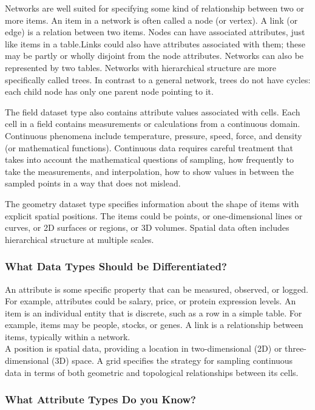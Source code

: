 \documentclass[
]{book}
\begin{document}
Networks are well suited for specifying some kind of relationship between two or more items. An item in a network is often called a node (or vertex). A link (or edge) is a relation between two items. Nodes can have associated attributes, just like items in a table.Links could also have attributes associated with them; these may be partly or wholly disjoint from the node attributes. Networks can also be represented by two tables. Networks with hierarchical structure are more specifically called trees. In contrast to a general network, trees do not have cycles: each child node has only one parent node pointing to it.

The field dataset type also contains attribute values associated with cells. Each cell in a field contains measurements or calculations from a continuous domain. Continuous phenomena include temperature, pressure, speed, force, and density (or mathematical functions).
Continuous data requires careful treatment that takes into account the mathematical questions of sampling, how frequently to take the measurements, and interpolation, how to show values in between the sampled points in a way that does not mislead.

The geometry dataset type specifies information about the shape of items with explicit spatial positions. The items could be points, or one-dimensional lines or curves, or 2D surfaces or regions, or 3D volumes. Spatial data often includes hierarchical structure at multiple scales.

\hypertarget{what-data-types-should-be-differentiated}{%
\subsubsection{What Data Types Should be Differentiated?}\label{what-data-types-should-be-differentiated}}

An attribute is some specific property that can be measured, observed, or logged. For example, attributes could be salary, price, or protein expression levels.
An item is an individual entity that is discrete, such as a row in a simple table. For example, items may be people, stocks, or genes.
A link is a relationship between items, typically within a network.\\
A position is spatial data, providing a location in two-dimensional (2D) or three-dimensional (3D) space.
A grid specifies the strategy for sampling continuous data in terms of both geometric and topological relationships between its cells.

\hypertarget{sec:variabletype}{%
\subsubsection{What Attribute Types Do you Know?}\label{sec:variabletype}}
\end{document}
